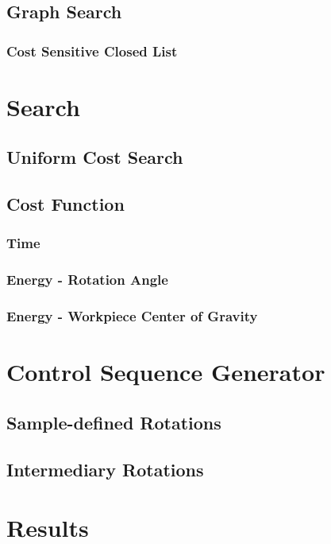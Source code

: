 	\subsection{Graph Search}

		\subsubsection{Cost Sensitive Closed List}

\section{Search}

	\subsection{Uniform Cost Search}

	\subsection{Cost Function}

		\subsubsection{Time}

		\subsubsection{Energy - Rotation Angle}

		\subsubsection{Energy - Workpiece Center of Gravity}

\section{Control Sequence Generator}

	\subsection{Sample-defined Rotations}

	\subsection{Intermediary Rotations}

\section{Results}

